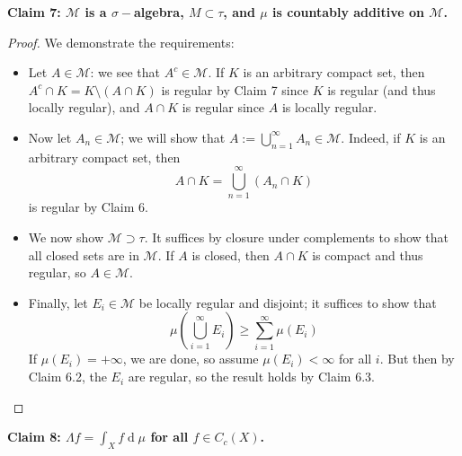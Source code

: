 \documentclass[12pt, a4paper]{book}
\renewcommand{\d}[1]{\ensuremath{\operatorname{d}\!{#1}}} %
\theoremstyle{nonumberplain}
\newtheorem{proof}{Proof}
\begin{document}
\textbf{Claim 7: $\mathcal{M}$ is a $\sigma-$algebra, $M\subset\tau$, and $\mu$ is countably additive on $\mathcal{M}$.}
\begin{proof}
    We demonstrate the requirements:
    \begin{itemize}[nolistsep]
        \item Let $A\in\mathcal{M}$: we see that $A^c\in\mathcal{M}$.
            If $K$ is an arbitrary compact set, then $A^c\cap K=K\setminus(A\cap K)$ is regular by Claim 7 since $K$ is regular (and thus locally regular), and $A\cap K$ is regular since $A$ is locally regular.
        \item Now let $A_n\in\mathcal{M}$; we will show that $A:=\bigcup\limits_{n=1}^\infty A_n\in\mathcal{M}$.
            Indeed, if $K$ is an arbitrary compact set, then
            \[A\cap K=\bigcup\limits_{n=1}^\infty (A_n\cap K)\]
            is regular by Claim 6.
        \item We now show $\mathcal{M}\supset\tau$.
            It suffices by closure under complements to show that all closed sets are in $\mathcal{M}$.
            If $A$ is closed, then $A\cap K$ is compact and thus regular, so $A\in\mathcal{M}$.
        \item Finally, let $E_i\in\mathcal{M}$ be locally regular and disjoint; it suffices to show that
            \begin{equation*}\mu\left(\bigcup\limits_{i=1}^\infty E_i\right)\geq\sum\limits_{i=1}^\infty \mu(E_i)\end{equation*}
            If $\mu(E_i)=+\infty$, we are done, so assume $\mu(E_i)<\infty$ for all $i$.
            But then by Claim 6.2, the $E_i$ are regular, so the result holds by Claim 6.3.
    \end{itemize}
\end{proof}
\textbf{Claim 8: $\Lambda f=\int_X f\d{\mu}$ for all $f\in C_c(X)$.}
\end{document}
